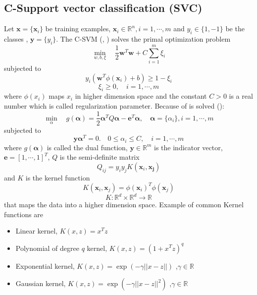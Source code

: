 \documentclass[../Main/thesis.tex]{subfiles}
\begin{document}
\subsection{C-Support vector classification (SVC)}
Let $\bm{x} = \{ \bm{x}_{i}\}$ be training examples, $\bm{x}_{i}\in \mathbb{R}^{n}, i = 1, \cdots, m$ and $y_{i}\in \{1,-1\}$ be the classes , $\bm{y} = \{ y_{i} \}$. The C-SVM (\cite{bosser1992}, \cite{vapnik1995}) solves the primal optimization problem
\begin{equation}
	\min_{w,b,\xi} \quad \frac{1}{2}\bm{w}^{T}\bm{w} + C\sum_{i = 1}^{m}\xi_{i}
\end{equation}
subjected to 
\begin{equation}
	y_{i}(\bm{w}^{T}\phi(\bm{x}_{i}) + b) \geq 1 - \xi_{i}
\end{equation}
\begin{equation}
	\xi_{i} \geq 0, \quad i = 1, \cdots, m
\end{equation}
where $\phi(x_{i})$ maps $x_{i}$ in higher dimension space and the constant $C > 0$ is a real number which is called regularization parameter.
Because of  is solved (\cite{chang2001}):
\begin{equation}\label{eq:cdual1}
	\min_{\alpha}\quad g(\bm{\alpha}) = \frac{1}{2}\bm{\alpha}^{T}Q\bm{\alpha}-\bm{e}^{T}\bm{\alpha}, \quad \bm{\alpha}=\{\alpha_{i}\}, i=1,\cdots,m
\end{equation}
subjected to 
\begin{equation}\label{eq:cdual2}
	\bm{y}\bm{\alpha}^{T} = 0. \quad 0 \leq \alpha_{i} \leq C,\quad  i = 1,\cdots, m
\end{equation}
\justify
where $g(\bm{\alpha})$ is called the dual function, $\bm{y}\in \mathbb{R}^{m}$ is the indicator vector, $\bm{e} = [1,\cdots,1]^{T}$, $Q$ is the semi-definite matrix
\begin{equation}\label{eq:Q}
	Q_{ij} = y_{i}y_{j}K(\bm{x}_{i},\bm{x_{j}})
\end{equation}
and $K$ is the kernel function 
\begin{equation}
	K(\bm{x}_{i},\bm{x}_{j}) = \phi(\bm{x}_{i})^{T}\phi(\bm{x}_{j})
\end{equation}
\begin{equation}
K: \mathbb{R}^{d}\times \mathbb{R}^{d} \rightarrow \mathbb{R}
\end{equation}
that  maps the data into a higher dimension space. Example of common Kernel functions are 
\begin{itemize}
	\item Linear kernel,  $K\left(x,z\right) = x^{T}z$
	\item Polynomial of degree $q$ kernel, $K\left(x,z\right) = \left(1+x^{T}z\right)^{q}$ 
	\item Exponential kernel,  $K(x,z) = \exp\left(-\gamma ||x-z||\right)$ ,$\gamma\in\mathbb{R}$
	\item Gaussian kernel,  $K(x,z) = \exp\left(-\gamma ||x-z||^{2}\right)$ ,$\gamma\in\mathbb{R}$
\end{itemize}
\end{document}
